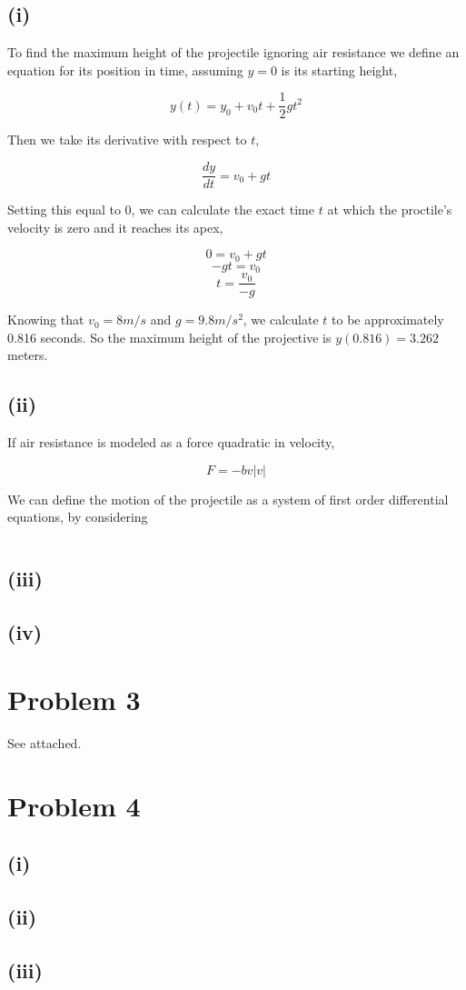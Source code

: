 \documentclass{article}
\begin{document}
\subsection*{(i)}
To find the maximum height of the projectile ignoring air resistance we define an equation for its position in time, assuming $y = 0$ is its starting height,

$$ y(t) = y_{0} + v_{0}t + \frac{1}{2}gt^{2} $$

Then we take its derivative with respect to $t$,

$$ \frac{dy}{dt} = v_{0} + gt $$

Setting this equal to $0$, we can calculate the exact time $t$ at which the proctile's velocity is zero and it reaches its apex,

$$ 0 = v_{0} + gt $$
$$ -gt = v_{0} $$
$$ t = \frac{v_{0}}{-g}$$

Knowing that $v_{0} = 8 m/s$ and $g = 9.8 m/s^2$, we calculate $t$ to be approximately 0.816 seconds.
So the maximum height of the projective is $y(0.816) = 3.262$ meters.

\subsection*{(ii)}
If air resistance is modeled as a force quadratic in velocity,

$$ F = -bv|v|$$

We can define the motion of the projectile as a system of first order differential equations, by considering 

$$ $$

\subsection*{(iii)}


\subsection*{(iv)}

\section*{Problem 3}
See attached.

\section*{Problem 4}

\subsection*{(i)}

\subsection*{(ii)}

\subsection*{(iii)}
\end{document}
